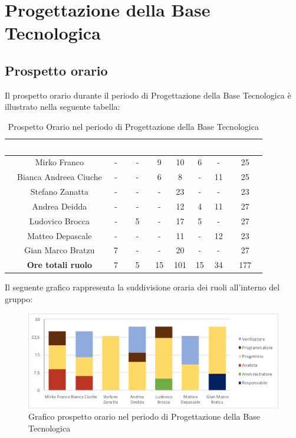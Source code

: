 \newpage

\section{Progettazione della Base Tecnologica}
\subsection{Prospetto orario}
Il prospetto orario durante il periodo di Progettazione della Base Tecnologica è illustrato nella seguente tabella:

\begin{table}[ht]
	\begin{center}
		\begin{tabular}{ccccccccc}
			\rowcolor{coolblack}
			\hline
			& \textcolor{white}{Nome} & \textcolor{white}{Re} & \textcolor{white}{Am} & \textcolor{white}{An} & \textcolor{white}{Pt} &\textcolor{white}{Pr} & \textcolor{white}{Ve} & \textcolor{white}{Totale} \\
			\hline
			&Mirko Franco & - & - & 9 & 10 & 6 & - & 25  \\
			&Bianca Andreea Ciuche & -& - & 6 & 8 & - & 11 & 25 \\
			&Stefano Zanatta &- & - & - & 23 & - & - & 23 \\
			&Andrea Deidda &  -& - & - & 12 & 4 & 11 & 27 \\
			&Ludovico Brocca & -& 5 & - & 17 & 5 & - & 27 \\
			&Matteo Depascale & -& - & - & 11 & - & 12 & 23 \\
			&Gian Marco Bratzu & 7& - & - & 20 & - & - & 27 \\
			\hline
			&\textbf{Ore totali ruolo} & 7 & 5 & 15 & 101 & 15 & 34 & 177 \\
		\end{tabular}
		\caption{Prospetto Orario nel periodo di Progettazione della Base Tecnologica}
	\end{center}
\end{table}

Il seguente grafico rappresenta la suddivisione oraria dei ruoli all'interno del gruppo:
\begin{figure}[!ht]
	\begin{center}
		\includegraphics[scale=0.85]{images/grafoProgettazioneTecnologica.png}
		\caption{Grafico prospetto orario nel periodo di Progettazione della Base Tecnologica}
	\end{center}
\end{figure}
\newpage
